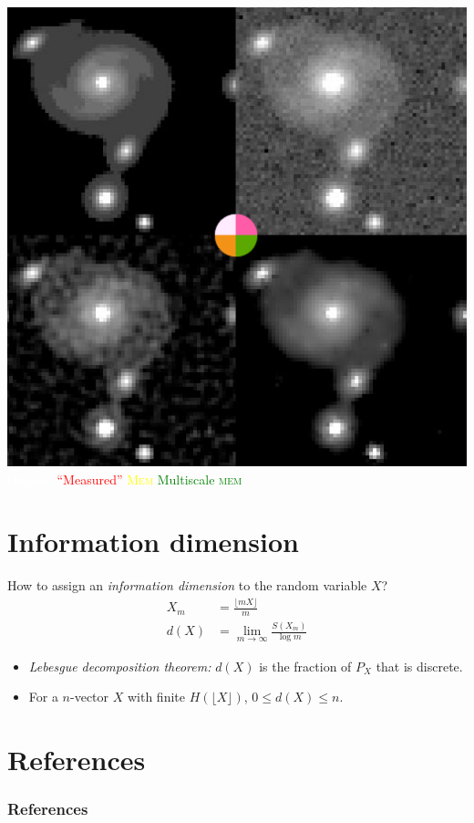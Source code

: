 \documentclass[14pt,c]{beamer}
\begin{document}
\begin{frame}
  \centering
  \includegraphics[width=0.625\framewidth]{astro-maxent}
  \\
  \textcolor{white}{Original}\;
  \textcolor{red}{``Measured''}\;
  \textcolor{yellow}{\textsc{Mem}}\;
  \textcolor{green}{Multiscale \textsc{mem}}

  \scriptsize
  \vspace{\baselineskip}
\end{frame}

\section{Information dimension}

\begin{frame}
  How to assign an \emph{information dimension} to the random variable $X$?
  \begin{align*}
    X_m &= \frac{\lfloor m X \rfloor}{m} \\
    d(X) &= \lim_{m \to \infty} \frac{S(X_m)}{\log m}
  \end{align*}
  \begin{itemize}
    \item \emph{Lebesgue decomposition theorem:} $d(X)$ is the fraction of
      $P_X$ that is discrete.

    \item For a $n$-vector $X$ with finite $H(\lfloor X \rfloor)$, $0 \le d(X)
      \le n$.
  \end{itemize}
\end{frame}

\section{References}

\begin{frame}
  \frametitle<presentation>{References}
  \nocite{*}
  \printbibliography%
\end{frame}
\end{document}
